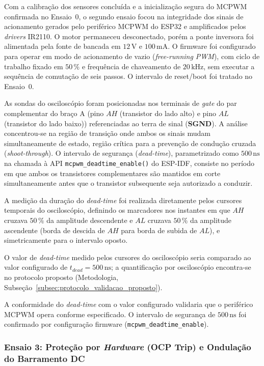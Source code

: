 Com a calibração dos sensores concluída e a inicialização segura do MCPWM confirmada no Ensaio~0, o segundo ensaio focou na integridade dos sinais de acionamento gerados pelo periférico MCPWM do ESP32 e amplificados pelos \textit{drivers} IR2110. O motor permaneceu desconectado, porém a ponte inversora foi alimentada pela fonte de bancada em $12\,\text{V}$ e $100\,\text{mA}$. O firmware foi configurado para operar em modo de acionamento de vazio (\textit{free-running PWM}), com ciclo de trabalho fixado em $50\,\%$ e frequência de chaveamento de $20\,\text{kHz}$, sem executar a sequência de comutação de seis passos. O intervalo de reset/boot foi tratado no Ensaio~0.

As sondas do osciloscópio foram posicionadas nos terminais de \textit{gate} do par complementar do braço A (pino $AH$ (transistor do lado alto) e pino $AL$ (transistor do lado baixo)) referenciadas ao terra de sinal (\textbf{SGND}). A análise concentrou-se na região de transição onde ambos os sinais mudam simultaneamente de estado, região crítica para a prevenção de condução cruzada (\textit{shoot-through}). O intervalo de segurança (\textit{dead-time}), parametrizado como $500\,\text{ns}$ na chamada à API \texttt{mcpwm\_deadtime\_enable()} do ESP-IDF, consiste no período em que ambos os transistores complementares são mantidos em corte simultaneamente antes que o transistor subsequente seja autorizado a conduzir.

A medição da duração do \textit{dead-time} foi realizada diretamente pelos cursores temporais do osciloscópio, definindo os marcadores nos instantes em que $AH$ cruzava $50\,\%$ da amplitude descendente e $AL$ cruzava $50\,\%$ da amplitude ascendente (borda de descida de $AH$ para borda de subida de $AL$), e simetricamente para o intervalo oposto.

O valor de \textit{dead-time} medido pelos cursores do osciloscópio seria comparado ao valor configurado de $t_{dead} = 500\,\text{ns}$; a quantificação por osciloscópio encontra-se no protocolo proposto (Metodologia, Subseção~\ref{subsec:protocolo_validacao_proposto}).

A conformidade do \textit{dead-time} com o valor configurado validaria que o periférico MCPWM opera conforme especificado. O intervalo de segurança de $500\,\text{ns}$ foi confirmado por configuração firmware (\texttt{mcpwm\_deadtime\_enable}).

\subsubsection{Ensaio 3: Proteção por \textit{Hardware} (OCP Trip) e Ondulação do Barramento DC}

